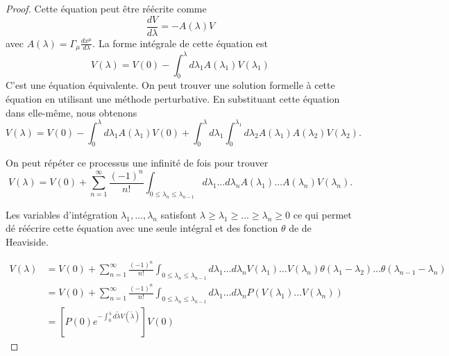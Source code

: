 \documentclass[a4paper,11pt]{report}
\theoremstyle{definition}
\theoremstyle{plain}
\theoremstyle{definition}
\theoremstyle{remark}
\begin{document}
                \begin{proof}
                    Cette équation peut être réécrite comme
                    \begin{equation}
                        \frac{dV}{d\lambda} = -A(\lambda)V
                    \end{equation}
                    avec $A(\lambda) = \Gamma_\mu \frac{dx^\mu}{d\lambda}$. La forme intégrale de cette équation est 
                    \begin{equation}
                        V(\lambda) = V(0) - \int_0^\lambda d\lambda_1 A(\lambda_1)V(\lambda_1)
                    \end{equation}
                    C'est une équation équivalente. On peut trouver une solution formelle à cette équation en utilisant une méthode perturbative. En substituant cette équation dans elle-même, nous obtenons
                    \begin{equation}
                        V(\lambda) = V(0) - \int_0^\lambda d\lambda_1 A(\lambda_1)V(0)+\int_0^\lambda d\lambda_1\int_0^{\lambda_1}d\lambda_2A(\lambda_1)A(\lambda_2)V(\lambda_2).
                    \end{equation}
                    
                    On peut répéter ce processus une infinité de fois pour trouver
                    \begin{equation}
                        V(\lambda) = V(0) + \sum_{n=1}^\infty\frac{(-1)^n}{n!}\int_{0\leq\lambda_n\leq\lambda_{n-1}}d\lambda_1\dots d\lambda_n A(\lambda_1)\dots A(\lambda_n)V(\lambda_n).
                    \end{equation}
        
                    Les variables d'intégration $\lambda_1,\dots,\lambda_n$ satisfont $\lambda\geq\lambda_1\geq\dots\geq\lambda_n\geq0$ ce qui permet dé réécrire cette équation avec une seule intégral et des fonction $\theta$ de de Heaviside.
                    
                    \begin{align}
                        V(\lambda) &= V(0) + \sum_{n=1}^\infty\frac{(-1)^n}{n!}\int_{0\leq\lambda_n\leq\lambda_{n-1}}d\lambda_1\dots d\lambda_n V(\lambda_1)\dots V(\lambda_n)\theta(\lambda_1-\lambda_2)\dots\theta(\lambda_{n-1}-\lambda_n) \\
                        &= V(0) + \sum_{n=1}^\infty\frac{(-1)^n}{n!}\int_{0\leq\lambda_n\leq\lambda_{n-1}}d\lambda_1\dots d\lambda_n P\left(V(\lambda_1)\dots V(\lambda_n)\right)\\
                        &= \left[P(0)e^{-\int_0^\lambda d\widetilde{\lambda}V(\widetilde{\lambda})}\right]V(0)
                    \end{align}
                \end{proof}
                
\end{document}
